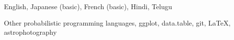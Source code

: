 

\begin{cvskills}


    {English, Japanese (basic), French (basic), Hindi, Telugu}

    {Other probabilistic programming languages, ggplot, data.table, git, LaTeX, astrophotography}


\end{cvskills}
